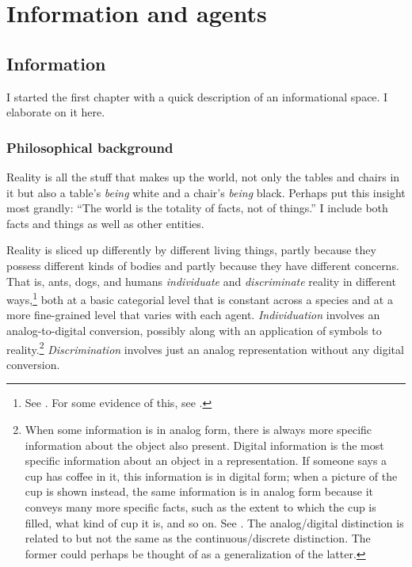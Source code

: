 \chapter{Information and agents} \label{ch:information and agents}


\section{Information} \label{sec:information}

I started the first chapter with a quick description of an informational space. I elaborate on it here.

\subsection{Philosophical background}
Reality is all the stuff that makes up the world, not only the tables and chairs in it but also a table's \emph{being} white and a chair's \emph{being} black. Perhaps \citet[5]{wittgenstein:tlp} put this insight most grandly: ``The world is the totality of facts, not of things.'' I include both facts and things as well as other entities. 


Reality is sliced up differently by different living things, partly because they possess different kinds of bodies and partly because they have different concerns. That is, ants, dogs, and humans \emph{individuate} and \emph{discriminate} reality in different ways,\footnote{See \citet[Chapter 2]{devlin:li}. For some evidence of this, see \citet{carruthers:obsm}.} both at a basic categorial level that is constant across a species and at a more fine-grained level that varies with each agent. \emph{Individuation} involves an 
analog-to-digital conversion, possibly along with an application of symbols to reality.\footnote{When some information is in analog form, there is always more specific information about the object also present. Digital information is the most specific information about an object in a representation. If someone says a cup has coffee in it, this information is in digital form; when a picture of the cup is shown instead, the same information is in analog form because it conveys many more specific facts, such as the extent to which the cup is filled, what kind of cup it is, and so on. See \citet[177]{dretske:kfi}. The analog/digital distinction is related to but not the same as the continuous/discrete distinction. The former could perhaps be thought of as a generalization of the latter.} \emph{Discrimination} involves just an analog representation without any digital conversion.

